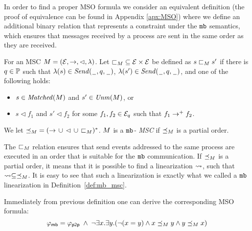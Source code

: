 In order to find a proper MSO formula we consider an equivalent definition (the proof of equivalence can be found in Appendix \ref{apx:MSO}) where  we define
	an additional binary relation that represents a constraint
	under the $\mathtt{mb}$ semantics, which ensures that messages received by a process are sent in the same order as they are received.



\begin{definition} \label{def:n_one_alt}
	For an MSC $M = (\mathcal{E},\to,\lhd,\lambda)$.	Let ${\sqsubset}_M \subseteq \mathcal{E} \times \mathcal{E}$
	be defined as $s \sqsubset_M s'$ if there is $q \in \mathbb{P}$
	such that $\lambda(s) \in {\mathit{Send}(\hspace{0.1em}\underline{\hspace{0.5em}}\hspace{0.1em},q,\hspace{0.1em}\underline{\hspace{0.5em}}\hspace{0.1em})}$,
	$\lambda(s') \in {\mathit{Send}(\hspace{0.1em}\underline{\hspace{0.5em}}\hspace{0.1em},q,\hspace{0.1em}\underline{\hspace{0.5em}}\hspace{0.1em})}$, and one of the following holds:
	\begin{itemize}%
		\item $s \in \mathit{Matched}(M)$ and $s' \in \mathit{Unm}(M)$, or
		\item $s \lhd f_1$ and $s' \lhd f_2$ for some $f_1,f_2 \in \mathcal{E}_q$ such that $f_1 \to^+ f_2$.
	\end{itemize}
	
	We let ${\preceq_M} = ({\to} \,\cup\, {\lhd} \,\cup\, {\sqsubset_M})^\ast$. 
	$M $ is a \emph{$\mathtt{mb}$- MSC}
	if ${\preceq_M}$ is a partial order. 
\end{definition}
The ${\sqsubset}_M$ relation ensures that send events addressed to the same process are executed in an order that is suitable for the $\mathtt{mb}$ communication. If ${\preceq_M}$ is a partial order, it means that it is possible to find a linearization $\rightsquigarrow$, such that $\rightsquigarrow \subseteq \preceq_M$. It is easy to see that such a linearization is exactly what we called a $\mathtt{mb}$ linearization in Definition~\ref{def:mb_msc}. 


Immediately from previous definition one can derive the corresponding  MSO formula:
\[
	\varphi_{\mathsf{mb}} = \varphi_{\mathsf{p2p}} \;\wedge\; \neg \exists x.\exists y.(\neg (x = y) \wedge x \preceq_M y \wedge y \preceq_M x)
\]




